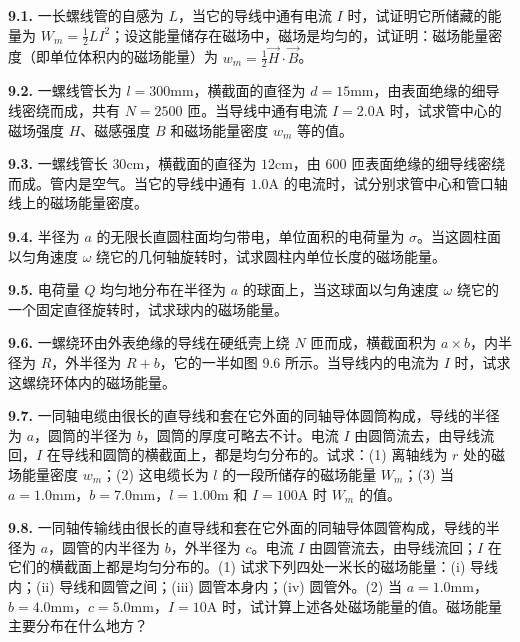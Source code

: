 \textbf{9.1.} 一长螺线管的自感为 $L$，当它的导线中通有电流 $I$ 时，试证明它所储藏的能量为 $\displaystyle W_{m} = \frac{1}{2} LI^{2}$；设这能量储存在磁场中，磁场是均匀的，试证明：磁场能量密度（即单位体积内的磁场能量）为 $\displaystyle w_{m} = \frac{1}{2} \vec{H} \cdot \vec{B}$。

\vfill
\newpage

\textbf{9.2.} 一螺线管长为 $l = 300\mathrm{mm}$，横截面的直径为 $d = 15\mathrm{mm}$，由表面绝缘的细导线密绕而成，共有 $N = 2500$ 匝。当导线中通有电流 $I = 2.0\mathrm{A}$ 时，试求管中心的磁场强度 $H$、磁感强度 $B$ 和磁场能量密度 $w_{m}$ 等的值。

\vfill
\newpage

\textbf{9.3.} 一螺线管长 $30\mathrm{cm}$，横截面的直径为 $12\mathrm{cm}$，由 $600$ 匝表面绝缘的细导线密绕而成。管内是空气。当它的导线中通有 $1.0\mathrm{A}$ 的电流时，试分别求管中心和管口轴线上的磁场能量密度。

\vfill
\newpage

\textbf{9.4.} 半径为 $a$ 的无限长直圆柱面均匀带电，单位面积的电荷量为 $\sigma$。当这圆柱面以匀角速度 $\omega$ 绕它的几何轴旋转时，试求圆柱内单位长度的磁场能量。

\vfill
\newpage

\textbf{9.5.} 电荷量 $Q$ 均匀地分布在半径为 $a$ 的球面上，当这球面以匀角速度 $\omega$ 绕它的一个固定直径旋转时，试求球内的磁场能量。

\vfill
\newpage

\textbf{9.6.} 一螺绕环由外表绝缘的导线在硬纸壳上绕 $N$ 匝而成，横截面积为 $a \times b$，内半径为 $R$，外半径为 $R + b$，它的一半如图 9.6 所示。当导线内的电流为 $I$ 时，试求这螺绕环体内的磁场能量。

\begin{center}
\end{center}

\vfill
\newpage

\textbf{9.7.} 一同轴电缆由很长的直导线和套在它外面的同轴导体圆筒构成，导线的半径为 $a$，圆筒的半径为 $b$，圆筒的厚度可略去不计。电流 $I$ 由圆筒流去，由导线流回，$I$ 在导线和圆筒的横截面上，都是均匀分布的。试求：(1) 离轴线为 $r$ 处的磁场能量密度 $w_{m}$；(2) 这电缆长为 $l$ 的一段所储存的磁场能量 $W_{m}$；(3) 当 $a = 1.0\mathrm{mm}$，$b = 7.0\mathrm{mm}$，$l = 1.00\mathrm{m}$ 和 $I = 100\mathrm{A}$ 时 $W_{m}$ 的值。

\vfill
\newpage

\textbf{9.8.} 一同轴传输线由很长的直导线和套在它外面的同轴导体圆管构成，导线的半径为 $a$，圆管的内半径为 $b$，外半径为 $c$。电流 $I$ 由圆管流去，由导线流回；$I$ 在它们的横截面上都是均匀分布的。(1) 试求下列四处一米长的磁场能量：(i) 导线内；(ii) 导线和圆管之间；(iii) 圆管本身内；(iv) 圆管外。(2) 当 $a = 1.0\mathrm{mm}$，$b = 4.0\mathrm{mm}$，$c = 5.0\mathrm{mm}$，$I = 10\mathrm{A}$ 时，试计算上述各处磁场能量的值。磁场能量主要分布在什么地方？

